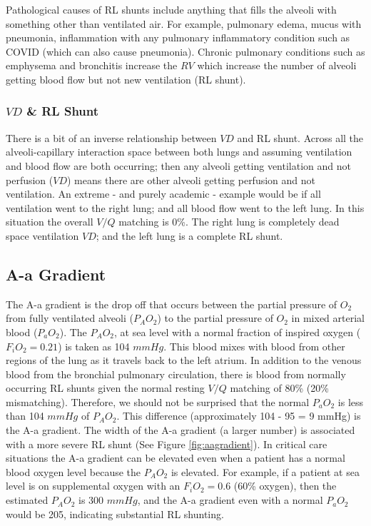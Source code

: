 Pathological causes of RL shunts include anything that fills the alveoli with something other than ventilated air. For example, pulmonary edema, mucus with pneumonia, inflammation with any pulmonary inflammatory condition such as COVID (which can also cause pneumonia). Chronic pulmonary conditions such as emphysema and bronchitis increase the $RV$ which increase the number of alveoli getting blood flow but not new ventilation (RL shunt).

\subsubsection{$VD$ \& RL Shunt}

There is a bit of an inverse relationship between $VD$ and RL shunt. Across all the alveoli-capillary interaction space between both lungs and assuming ventilation and blood flow are both occurring; then any alveoli getting ventilation and not perfusion ($VD$) means there are other alveoli getting perfusion and not ventilation. An extreme - and purely academic - example would be if all ventilation went to the right lung; and all blood flow went to the left lung. In this situation the overall $V/Q$ matching is 0\%. The right lung is completely dead space ventilation $VD$; and the left lung is a complete RL shunt.


\subsection{A-a Gradient}

The A-a gradient is the drop off that occurs between the partial pressure of $O_2$ from fully ventilated alveoli ($P_AO_2$) to the partial pressure of $O_2$ in mixed arterial blood ($P_aO_2$). The $P_AO_2$, at sea level with a normal fraction of inspired oxygen ($F_iO_2 = 0.21$) is taken as 104 $mmHg$. This blood mixes with blood from other regions of the lung as it travels back to the left atrium. In addition to the venous blood from the bronchial pulmonary circulation, there is blood from normally occurring RL shunts given the normal resting $V/Q$ matching of 80\% (20\% mismatching). Therefore, we should not be surprised that the normal $P_aO_2$ is less than 104 $mmHg$ of $P_AO_2$. This difference (approximately 104 - 95 = 9 mmHg) is the A-a gradient. The width of the A-a gradient (a larger number) is associated with a more severe RL shunt (See Figure \ref{fig:aagradient}). In critical care situations the A-a gradient can be elevated even when a patient has a normal blood oxygen level because the $P_AO_2$ is elevated. 
For example, if a patient at sea level is on supplemental oxygen with an $F_iO_2 = 0.6$ (60\% oxygen), then the estimated $P_AO_2$ is 300 $mmHg$, and the A-a gradient even with a normal $P_aO_2$ would be 205, indicating substantial RL shunting.

